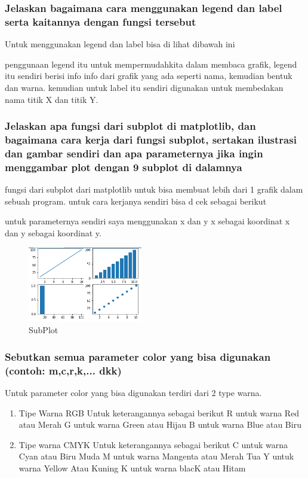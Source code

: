 \subsubsection{Jelaskan bagaimana cara menggunakan legend dan label serta kaitannya dengan fungsi tersebut}
\hfill \break
Untuk menggunakan legend dan label bisa di lihat dibawah ini

penggunaan legend itu untuk mempermudahkita dalam membaca grafik, legend itu sendiri berisi info info dari grafik yang ada seperti nama, kemudian bentuk dan warna.
kemudian untuk label itu sendiri digunakan untuk membedakan nama titik X dan titik Y.
\subsubsection{Jelaskan apa fungsi dari subplot di matplotlib, dan bagaimana cara kerja dari fungsi subplot, sertakan ilustrasi dan gambar sendiri dan apa parameternya jika ingin menggambar plot dengan 9 subplot di dalamnya}
\hfill \break
fungsi dari subplot dari matplotlib untuk bisa membuat lebih dari 1 grafik dalam sebuah program.
untuk cara kerjanya sendiri bisa d cek sebagai berikut

untuk parameternya sendiri saya menggunakan x dan y x sebagai koordinat x dan y sebagai koordinat y.
\begin{figure}[H]	
    \includegraphics[width=5cm]{figures/6/1174027/teori/chart.png}
    \centering
    \caption{SubPlot}
\end{figure}
\subsubsection{Sebutkan semua parameter color yang bisa digunakan (contoh: m,c,r,k,... dkk)}
\hfill \break
Untuk parameter color yang bisa digunakan terdiri dari 2 type warna.
\begin{enumerate}
    \item Tipe Warna RGB
    Untuk keterangannya sebagai berikut
    R untuk warna Red atau Merah
    G untuk warna Green atau Hijau
    B untuk warna Blue atau Biru
    \item Tipe warna CMYK
    Untuk keterangannya sebagai berikut
    C untuk warna Cyan atau Biru Muda
    M untuk warna Mangenta atau Merah Tua
    Y untuk warna Yellow Atau Kuning
    K untuk warna blacK atau Hitam
\end{enumerate}

